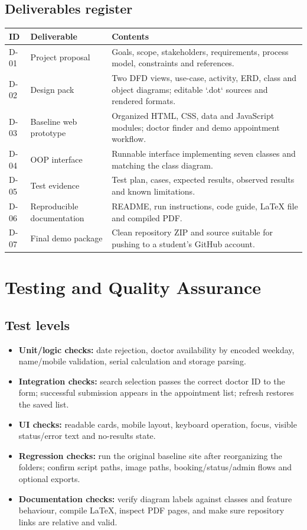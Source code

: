 \documentclass[11pt,a4paper]{article}
\begin{document}
\subsection{Deliverables register}
\begin{tabularx}{\textwidth}{p{1.5cm}p{4.2cm}X}
\toprule \textbf{ID} & \textbf{Deliverable} & \textbf{Contents}\\\midrule
D-01 & Project proposal & Goals, scope, stakeholders, requirements, process model, constraints and references.\\
D-02 & Design pack & Two DFD views, use-case, activity, ERD, class and object diagrams; editable `.dot` sources and rendered formats.\\
D-03 & Baseline web prototype & Organized HTML, CSS, data and JavaScript modules; doctor finder and demo appointment workflow.\\
D-04 & OOP interface & Runnable interface implementing seven classes and matching the class diagram.\\
D-05 & Test evidence & Test plan, cases, expected results, observed results and known limitations.\\
D-06 & Reproducible documentation & README, run instructions, code guide, LaTeX file and compiled PDF.\\
D-07 & Final demo package & Clean repository ZIP and source suitable for pushing to a student's GitHub account.\\
\bottomrule
\end{tabularx}

\section{Testing and Quality Assurance}
\subsection{Test levels}
\begin{itemize}
  \item \textbf{Unit/logic checks:} date rejection, doctor availability by encoded weekday, name/mobile validation, serial calculation and storage parsing.
  \item \textbf{Integration checks:} search selection passes the correct doctor ID to the form; successful submission appears in the appointment list; refresh restores the saved list.
  \item \textbf{UI checks:} readable cards, mobile layout, keyboard operation, focus, visible status/error text and no-results state.
  \item \textbf{Regression checks:} run the original baseline site after reorganizing the folders; confirm script paths, image paths, booking/status/admin flows and optional exports.
  \item \textbf{Documentation checks:} verify diagram labels against classes and feature behaviour, compile LaTeX, inspect PDF pages, and make sure repository links are relative and valid.
\end{itemize}
\end{document}
